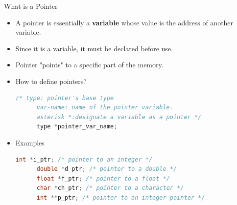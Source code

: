 \documentclass[10pt,t]{beamer}
\begin{document}
\begin{frame}[fragile]{What is a Pointer}
  \begin{itemize}
  \item A pointer is essentially a \textbf{\color{red}variable} whose value is the address of another variable.
  \item Since it is a variable, it must be declared before use.
  \item Pointer "points" to a specific part of the memory.
  \item How to define pointers?
    \begin{lstlisting}[language=C,basicstyle=\scriptsize\ttfamily]
      /* type: pointer's base type
      var-name: name of the pointer variable.
      asterisk *:designate a variable as a pointer */
      type *pointer_var_name;
    \end{lstlisting}
  \item Examples
    \begin{lstlisting}[language=C,basicstyle=\scriptsize\ttfamily]
      int *i_ptr; /* pointer to an integer */
      double *d_ptr; /* pointer to a double */
      float *f_ptr; /* pointer to a float */
      char *ch_ptr; /* pointer to a character */
      int **p_ptr; /* pointer to an integer pointer */
    \end{lstlisting}
  \end{itemize}
\end{frame}
\end{document}
